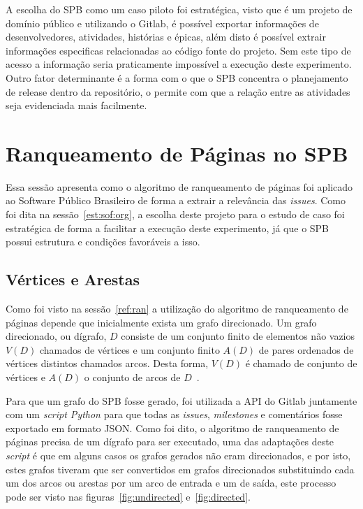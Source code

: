 A escolha do SPB como um caso piloto foi estratégica, visto que é um projeto de 
domínio público e utilizando o Gitlab, é possível exportar informações de
desenvolvedores, atividades, histórias e épicas, além disto é possível extrair
informações especificas relacionadas ao código fonte do projeto. Sem este tipo
de acesso a informação seria praticamente impossível a execução deste experimento.
Outro fator determinante é a forma com o que o SPB concentra o planejamento de release
dentro da repositório, o permite com que a relação entre as atividades seja evidenciada
mais facilmente.

\section{Ranqueamento de Páginas no SPB}
\label{est:ran}

Essa sessão apresenta como o algoritmo de ranqueamento de páginas foi aplicado
ao Software Público Brasileiro de forma a extrair a relevância das \textit{issues}.
Como foi dita na sessão~\ref{est:sof:org}, a escolha deste projeto para o estudo de caso
foi estratégica de forma a facilitar a execução deste experimento, já que o SPB possui 
estrutura e condições favoráveis a isso.

\subsection{Vértices e Arestas}
\label{est:ran:ver}

Como foi visto na sessão~\ref{ref:ran} a utilização do algoritmo de ranqueamento
de páginas depende que inicialmente exista um grafo direcionado. Um grafo direcionado, 
ou dígrafo, $D$ consiste de um conjunto finito de elementos não vazios $V(D)$
chamados de vértices e um conjunto finito $A(D)$ de pares ordenados de vértices
distintos chamados arcos. Desta forma, $V(D)$ é chamado de conjunto de vértices e
$A(D)$ o conjunto de arcos de $D$~\cite{bang}.

Para que um grafo do SPB fosse gerado, foi utilizada a API do Gitlab juntamente
com um \textit{script Python} para que todas as \textit{issues}, \textit{milestones} e
comentários fosse exportado em formato JSON. Como foi dito, o algoritmo de
ranqueamento de páginas precisa de um dígrafo para ser executado, uma das adaptações
deste \textit{script} é que em alguns casos os grafos gerados não eram direcionados,
e por isto, estes grafos tiveram que ser convertidos em grafos direcionados substituindo
cada um dos arcos ou arestas por um arco de entrada e um de saída, este processo pode
ser visto nas figuras~\ref{fig:undirected} e~\ref{fig:directed}.

